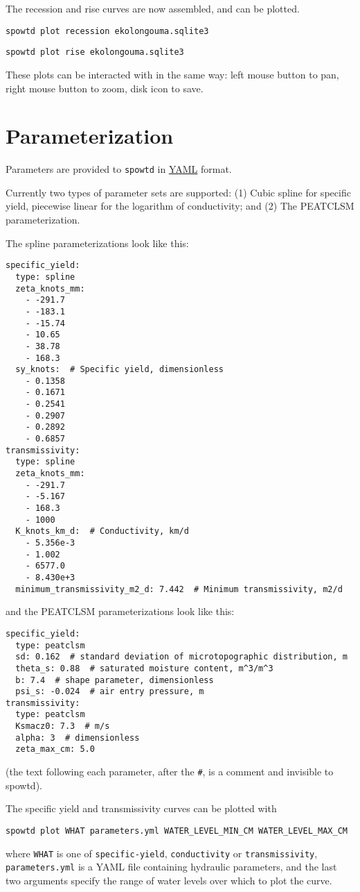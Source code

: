 \documentclass[11pt,a4paper]{article}
\begin{document}
The recession and rise curves are now assembled, and can be plotted.
\begin{lstlisting}[frame=single]
spowtd plot recession ekolongouma.sqlite3
\end{lstlisting}

\begin{lstlisting}[frame=single]
spowtd plot rise ekolongouma.sqlite3
\end{lstlisting}
These plots can be interacted with in the same way: left mouse button
to pan, right mouse button to zoom, disk icon to save.

\section{Parameterization}
Parameters are provided to \texttt{spowtd} in
\href{https://yaml.org/}{YAML} format.

Currently two types of parameter sets are supported: (1) Cubic spline
for specific yield, piecewise linear for the logarithm of
conductivity; and (2) The PEATCLSM parameterization.

The spline parameterizations look like this:
\begin{lstlisting}[frame=single]
specific_yield:
  type: spline
  zeta_knots_mm:
    - -291.7
    - -183.1
    - -15.74
    - 10.65
    - 38.78
    - 168.3
  sy_knots:  # Specific yield, dimensionless
    - 0.1358
    - 0.1671
    - 0.2541
    - 0.2907
    - 0.2892
    - 0.6857
transmissivity:
  type: spline
  zeta_knots_mm:
    - -291.7
    - -5.167
    - 168.3
    - 1000
  K_knots_km_d:  # Conductivity, km/d
    - 5.356e-3
    - 1.002
    - 6577.0
    - 8.430e+3
  minimum_transmissivity_m2_d: 7.442  # Minimum transmissivity, m2/d
\end{lstlisting}
and the PEATCLSM parameterizations look like this:
\begin{lstlisting}[frame=single]
specific_yield:
  type: peatclsm
  sd: 0.162  # standard deviation of microtopographic distribution, m
  theta_s: 0.88  # saturated moisture content, m^3/m^3
  b: 7.4  # shape parameter, dimensionless
  psi_s: -0.024  # air entry pressure, m
transmissivity:
  type: peatclsm
  Ksmacz0: 7.3  # m/s
  alpha: 3  # dimensionless
  zeta_max_cm: 5.0
\end{lstlisting}
(the text following each parameter, after the \verb|#|, is a comment
and invisible to spowtd).

The specific yield and transmissivity curves can be plotted with
\begin{lstlisting}[frame=single]
  spowtd plot WHAT parameters.yml WATER_LEVEL_MIN_CM WATER_LEVEL_MAX_CM
\end{lstlisting}
where \texttt{WHAT} is one of \texttt{specific-yield},
\texttt{conductivity} or \texttt{transmissivity},
\texttt{parameters.yml} is a YAML file containing hydraulic
parameters, and the last two arguments specify the range of water
levels over which to plot the curve.
\end{document}
